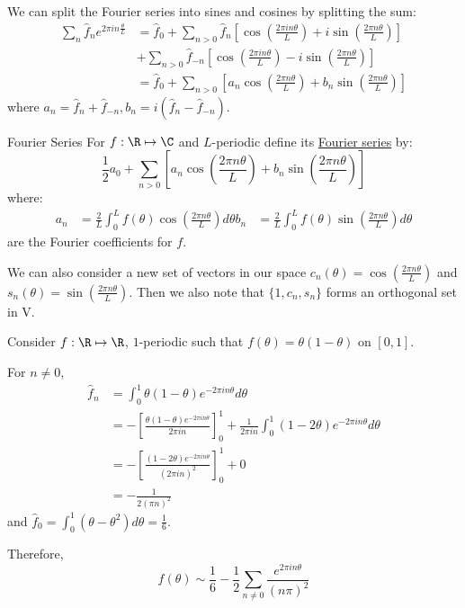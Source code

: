\documentclass[../Main.tex]{subfiles}
\begin{document}
We can split the Fourier series into sines and cosines by splitting the sum:
\begin{align*}
    \sum_n \hat{f}_n e^{2\pi i n \frac{\theta}{L}} &= \hat{f}_0 + \sum_{n > 0} \hat{f}_n \left[\cos\left(\frac{2\pi i n \theta}{L}\right) + i\sin\left(\frac{2\pi n \theta}{L}\right)\right] \\
    &+ \sum_{n > 0} \hat{f}_{-n} \left[\cos\left(\frac{2\pi i n \theta}{L}\right) - i\sin\left(\frac{2\pi n \theta}{L}\right)\right] \\ 
    &= \hat{f}_0 + \sum_{n > 0} \left[a_n \cos\left(\frac{2\pi n \theta}{L}\right) + b_n \sin \left(\frac{2\pi n \theta}{L}\right)\right]
\end{align*}
where $a_n = \hat{f}_n + \hat{f}_{-n}, b_n = i (\hat{f}_n - \hat{f}_{-n})$.
\begin{definition}{Fourier Series}
    For $f : \R \mapsto \C$ and $L$-periodic define its \underline{Fourier series} by:
    \begin{equation}
        \frac{1}{2} a_0 + \sum_{n > 0} \left[a_n \cos\left(\frac{2\pi n \theta}{L}\right) + b_n \sin \left(\frac{2\pi n \theta}{L}\right)\right]
        \label{eqnFourierSeries}
    \end{equation}
    where:
    \begin{align*}
        a_n &= \frac{2}{L} \int_0^L f(\theta) \cos\left(\frac{2\pi n \theta}{L}\right)d\theta
        b_n &= \frac{2}{L} \int_0^L f(\theta) \sin\left(\frac{2\pi n \theta}{L}\right)d\theta
    \end{align*}
    are the Fourier coefficients for $f$.
\end{definition}
We can also consider a new set of vectors in our space $c_n(\theta) = \cos\left(\frac{2\pi n \theta}{L}\right)$ and $s_n(\theta) = \sin\left(\frac{2\pi n \theta}{L}\right)$. Then we also note that $\{1, c_n, s_n\}$ forms an orthogonal set in V.

\begin{example}
    Consider $f : \R \mapsto \R$, $1$-periodic such that $f(\theta) = \theta(1-\theta)$ on $[0, 1]$.

    For $n \neq 0$,
    \begin{align*}
        \hat{f}_n &= \int_0^1 \theta(1-\theta) e^{-2\pi i n \theta} d\theta \\
        &= -\left[\frac{\theta(1-\theta) e^{-2\pi i n \theta}}{2 \pi i n}\right]_0^1 + \frac{1}{2\pi i n} \int_0^1 (1 - 2\theta) e^{-2\pi i n \theta}d\theta \\
        &= -\left[\frac{(1-2\theta) e^{-2\pi i n \theta}}{(2 \pi i n)^2}\right]_0^1 + 0 \\
        &= -\frac{1}{2(\pi n)^2}
    \end{align*}
    and $\hat{f}_0 = \int_0^1 (\theta - \theta^2) d\theta = \frac16$.

    Therefore,
    \begin{equation*}
        f(\theta) \sim \frac{1}{6} - \frac{1}{2} \sum_{n \neq 0} \frac{e^{2\pi i n \theta}}{(n \pi)^2}
    \end{equation*}
\end{example}
\end{document}
